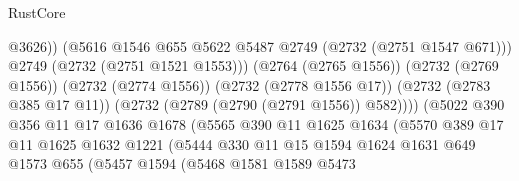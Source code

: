 \begin{lexlean}{RustCore}
\begin{coremodule}
                                              @3626))
                                          (@5616
                                            @1546
                                            @655
                                            @5622
                                            @5487
                                            @2749
                                            (@2732 (@2751 @1547 @671)))
                                          @2749
                                          (@2732 (@2751 @1521 @1553)))
                                        (@2764 (@2765 @1556))
                                        (@2732 (@2769 @1556))
                                        (@2732 (@2774 @1556))
                                        (@2732 (@2778 @1556 @17))
                                        (@2732 (@2783 @385 @17 @11))
                                        (@2732 (@2789 (@2790 (@2791 @1556)) @582))))
                                    (@5022
                                      @390
                                      @356
                                      @11
                                      @17
                                      @1636
                                      @1678
                                      (@5565
                                        @390
                                        @11
                                        @1625
                                        @1634
                                        (@5570
                                          @389
                                          @17
                                          @11
                                          @1625
                                          @1632
                                          @1221
                                          (@5444
                                            @330
                                            @11
                                            @15
                                            @1594
                                            @1624
                                            @1631
                                            @649
                                            @1573
                                            @655
                                            (@5457
                                              @1594
                                              (@5468
                                                @1581
                                                @1589
                                                @5473

\end{coremodule}
\end{lexlean}
